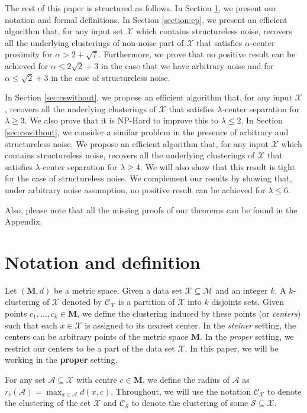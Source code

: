 \documentclass[anon,12pt]{colt2016} %
\newcommand{\mc}{\mathcal}
\newcommand{\mb}{\mathbf}
\begin{document}
The rest of this paper is structured as follows. In Section \ref{sec:Notation}, we present our notation and formal definitions. In Section \ref{section:cp}, we present an efficient algorithm that, for any input set $\mc X$ which contains structureless noise, recovers all the underlying clusterings of non-noise part of $\mc X$ that satisfies $\alpha$-center proximity for $\alpha > 2+\sqrt{7}$. Furthermore, we prove that no positive result can be achieved for $\alpha \leq 2\sqrt{2}+3$ in the case that we have arbitrary noise and for $\alpha \leq \sqrt{2}+3$ in the case of structureless noise.

In Section \ref{sec:cswithout}, we propose an efficient algorithm that, for any input $\mc X$, recovers all the underlying clusterings of $\mc X$ that satisfies $\lambda$-center separation for $\lambda \geq 3$. We also prove that it is NP-Hard to improve this to $\lambda \leq 2$. In Section \ref{sec:cswithout}, we consider a similar problem in the presence of arbitrary and structureless noise. We propose an efficient algorithm that, for any input $\mc X$ which contains structureless noise, recovers all the underlying clusterings of $\mc X$ that satisfies $\lambda$-center separation for $\lambda \geq 4$. We will also show that this result is tight for the case of structureless noise. We complement our results by showing that, under arbitrary noise assumption, no positive result can be achieved for $\lambda \leq 6$.

Also, please note that all the missing proofs of our theorems can be found in the Appendix.

\section{Notation and definition}
\label{sec:Notation}
Let $(\mb M, d)$ be a metric space. Given a data set $\mc X \subseteq \mc M$ and an integer $k$. A $k$-clustering of $\mc X$ denoted by $\mc C_{\mc X}$ is a partition of $\mc X$ into $k$ disjoints sets. Given points $c_1, \ldots, c_k \in \mb M$, we define the clustering induced by these points (or {\it centers}) such that each $x \in \mc X$ is assigned to its nearest center. In the {\it steiner} setting, the centers can be arbitrary points of the metric space $\mb M$. In the {\it proper} setting, we restrict our centers to be a part of the data set $\mc X$. In this paper, we will be working in the {\bf proper} setting.

For any set $\mc A\subseteq \mc X$ with centre $c\in \mb M$, we define the radius of $\mc A$ as $r_c(\mc A) = \max_{x \in \mc A} d(x, c)$. Throughout, we will use the notation $\mc C_{\mc X}$ to denote the clustering of the set $\mc X$ and $\mc C_{\mc S}$ to denote the clustering of some $\mc S\subseteq \mc X$. 
\end{document}
